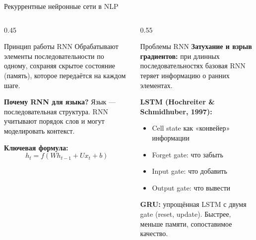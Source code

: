 \documentclass[aspectratio=169, 9pt]{beamer}
\begin{document}
\begin{frame}{Рекуррентные нейронные сети в NLP}
  \begin{columns}[T]
    \begin{column}{0.45\textwidth}
      \begin{block}{Принцип работы RNN}
        Обрабатывают элементы последовательности по одному, сохраняя скрытое состояние (память), которое передаётся на каждом шаге.
      \end{block}
      
      \textbf{Почему RNN для языка?}
      Язык — последовательная структура. RNN учитывают порядок слов и могут моделировать контекст.
      
      \vspace{0.3em}
      \textbf{Ключевая формула:}
      \[
      h_t = f(W h_{t-1} + U x_t + b)
      \]
    \end{column}
    \begin{column}{0.55\textwidth}
      \begin{block}{Проблемы RNN}
        \textbf{Затухание и взрыв градиентов:} при длинных последовательностях базовая RNN теряет информацию о ранних элементах.
      \end{block}
      
      \textbf{LSTM (Hochreiter \& Schmidhuber, 1997):}
      \begin{itemize}
        \item Cell state как «конвейер» информации
        \item Forget gate: что забыть
        \item Input gate: что добавить
        \item Output gate: что вывести
      \end{itemize}
      
      \textbf{GRU:} упрощённая LSTM с двумя gate (reset, update). Быстрее, меньше памяти, сопоставимое качество.
    \end{column}
  \end{columns}
\end{frame}
\end{document}
